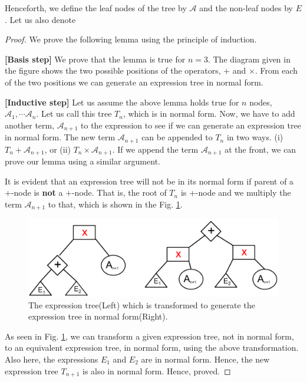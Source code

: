 \documentclass{article}
\newcommand{\Aa}{\mathcal{A}}
\begin{document}
Henceforth, we define the leaf nodes of the tree by $\Aa$ and the non-leaf nodes by $E$. Let us also denote 

\begin{proof} We prove the following lemma using the principle of induction.
 
   {\bf [Basis step]} We prove that the lemma is true for $n = 3$.  The diagram given in the figure shows the two possible positions of the operators, $+$ and $\times$. From each of the two positions we can generate an expression tree in normal form.

  {\bf [Inductive step]}  Let us assume the above lemma holds true for $n$ nodes, $\Aa_{1} , \cdots \Aa_{n}$. Let us call this tree $T_n$, which is in normal form. Now, we have to add another term, $\Aa_{n+1}$ to the expression to see if we can generate an expression tree in normal form. The new term $\Aa_{n+1}$ can be appended to  $T_n$ in two ways. (i) $T_n + \Aa_{n+1}$, or (ii) $T_n \times \Aa_{n+1}$. If we append the term $\Aa_{n+1}$ at the front, we can prove our lemma using a similar argument.

\noindent It is evident that an expression tree will not be in its normal form if parent of a +-node is {\bf not} a +-node. That  is, the root of $T_n$ is +-node and we multiply the term $\Aa_{n+1}$ to that, which is shown in the Fig. \ref{fig4}.

\begin{figure}
   \centering
   \includegraphics[width=\linewidth]{hw0_4.png}
    \caption{The expression tree(Left) which is transformed to generate the expression tree in normal form(Right).}
    \label{fig4}
\end{figure}

\noindent As seen in Fig. \ref{fig4}, we can transform a given expression tree, not in normal form, to an equivalent expression tree, in normal form, using the above transformation. Also here, the expressions $E_1$ and $E_2$ are in normal form. Hence, the new expression tree $T_{n+1}$ is also in normal form. Hence, proved.

\end{proof}
\end{document}

